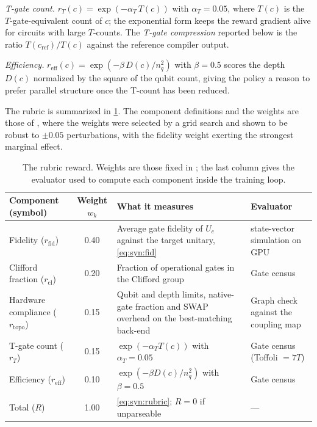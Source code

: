 \emph{T-gate count.} $r_{T}(c)=\exp(-\alpha_T\,T(c))$ with $\alpha_T=0.05$, where $T(c)$ is the $T$-gate-equivalent count of $c$; the exponential form keeps the reward gradient alive for circuits with large $T$-counts. The \emph{T-gate compression} reported below is the ratio $T(c_{\mathrm{ref}})/T(c)$ against the reference compiler output.

\emph{Efficiency.} $r_{\mathrm{eff}}(c)=\exp(-\beta\,D(c)/n_q^{2})$ with $\beta=0.5$ scores the depth $D(c)$ normalized by the square of the qubit count, giving the policy a reason to prefer parallel structure once the T-count has been reduced.

The rubric is summarized in \cref{tab:syn:rubric}. The component definitions and the weights are those of \cite{guo2026rubriq}, where the weights were selected by a grid search and shown to be robust to $\pm0.05$ perturbations, with the fidelity weight exerting the strongest marginal effect.

\begin{table}[htbp]
\caption{The \rubriq{} rubric reward. Weights are those fixed in \cite{guo2026rubriq}; the last column gives the evaluator used to compute each component inside the training loop.}
\label{tab:syn:rubric}
\centering\footnotesize
\begin{tabularx}{\textwidth}{@{}l c X X@{}}
\toprule
Component (symbol) & Weight $w_k$ & What it measures & Evaluator \\
\midrule
Fidelity ($r_{\mathrm{fid}}$) & 0.40 & Average gate fidelity of $U_c$ against the target unitary, \cref{eq:syn:fid} & \cudaq{} state-vector simulation on GPU \\
Clifford fraction ($r_{\mathrm{cl}}$) & 0.20 & Fraction of operational gates in the Clifford group & Gate census \\
Hardware compliance ($r_{\mathrm{topo}}$) & 0.15 & Qubit and depth limits, native-gate fraction and SWAP overhead on the best-matching back-end & Graph check against the coupling map \\
T-gate count ($r_{T}$) & 0.15 & $\exp(-\alpha_T T(c))$ with $\alpha_T=0.05$ & Gate census (Toffoli $=7T$) \\
Efficiency ($r_{\mathrm{eff}}$) & 0.10 & $\exp(-\beta D(c)/n_q^{2})$ with $\beta=0.5$ & Gate census \\
\midrule
Total ($R$) & 1.00 & \cref{eq:syn:rubric}; $R=0$ if unparseable & --- \\
\bottomrule
\end{tabularx}
\end{table}

